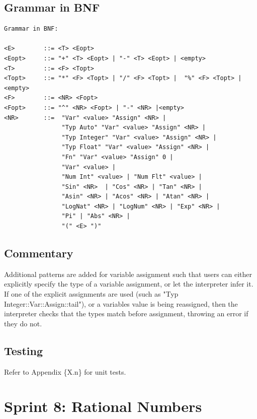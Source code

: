 \documentclass[a4paper, oneside, 11pt]{report}
\begin{document}
    \subsection{Grammar in BNF}
    \begin{verbatim}
Grammar in BNF:

<E>        ::= <T> <Eopt>
<Eopt>     ::= "+" <T> <Eopt> | "-" <T> <Eopt> | <empty>
<T>        ::= <F> <Topt>
<Topt>     ::= "*" <F> <Topt> | "/" <F> <Topt> |  "%" <F> <Topt> |<empty>
<F>        ::= <NR> <Fopt>
<Fopt>     ::= "^" <NR> <Fopt> | "-" <NR> |<empty>
<NR>       ::=  "Var" <value> "Assign" <NR> |
                "Typ Auto" "Var" <value> "Assign" <NR> |
                "Typ Integer" "Var" <value> "Assign" <NR> |
                "Typ Float" "Var" <value> "Assign" <NR> |
                "Fn" "Var" <value> "Assign" 0 |
                "Var" <value> |
                "Num Int" <value> | "Num Flt" <value> |
                "Sin" <NR>  | "Cos" <NR> | "Tan" <NR> |
                "Asin" <NR> | "Acos" <NR> | "Atan" <NR> |
                "LogNat" <NR> | "LogNum" <NR> | "Exp" <NR> |
                "Pi" | "Abs" <NR> |
                "(" <E> ")"
    \end{verbatim}
    \subsection{Commentary}
    Additional patterns are added for variable assignment such that users can either explicitly specify the type of a variable assignment, or let the interpreter infer it. If one of the explicit assignments are used (such as "Typ Integer::Var::Assign::tail"), or a variables value is being reassigned, then the interpreter checks that the types match before assignment, throwing an error if they do not.

    \subsection{Testing}
    Refer to Appendix \{X.n\} for unit tests.

    \clearpage
    \section{Sprint 8: Rational Numbers}
\end{document}
